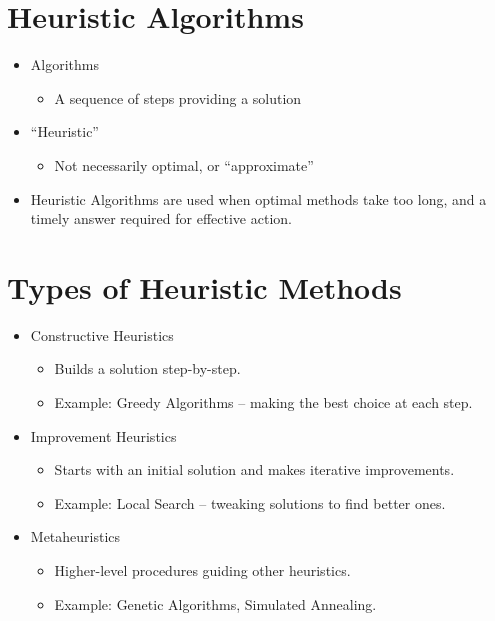 \documentclass[
  letterpaper,
  DIV=11,
  numbers=noendperiod]{scrreprt}
\providecommand{\tightlist}{%
  \setlength{\itemsep}{0pt}\setlength{\parskip}{0pt}}\usepackage{longtable,booktabs,array}
\begin{document}

\chapter{Heuristic Algorithms}\label{heuristic-algorithms}

\begin{itemize}
\tightlist
\item
  Algorithms

  \begin{itemize}
  \tightlist
  \item
    A sequence of steps providing a solution
  \end{itemize}
\item
  ``Heuristic''

  \begin{itemize}
  \tightlist
  \item
    Not necessarily optimal, or ``approximate''
  \end{itemize}
\item
  Heuristic Algorithms are used when optimal methods take too long, and
  a timely answer required for effective action.
\end{itemize}


\chapter{Types of Heuristic Methods}\label{types-of-heuristic-methods}

\begin{itemize}
\tightlist
\item
  Constructive Heuristics

  \begin{itemize}
  \tightlist
  \item
    Builds a solution step-by-step.
  \item
    Example: Greedy Algorithms -- making the best choice at each step.
  \end{itemize}
\item
  Improvement Heuristics

  \begin{itemize}
  \tightlist
  \item
    Starts with an initial solution and makes iterative improvements.
  \item
    Example: Local Search -- tweaking solutions to find better ones.
  \end{itemize}
\item
  Metaheuristics

  \begin{itemize}
  \tightlist
  \item
    Higher-level procedures guiding other heuristics.
  \item
    Example: Genetic Algorithms, Simulated Annealing.
  \end{itemize}
\end{itemize}
\end{document}
